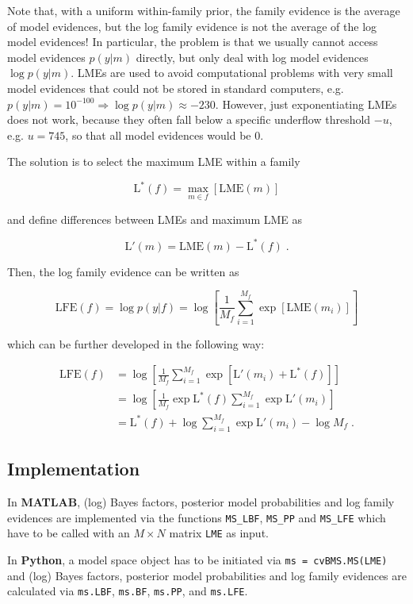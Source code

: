 \vspace{1em}
Note that, with a uniform within-family prior, the family evidence is the average of model evidences, but the log family evidence is not the average of the log model evidences! In particular, the problem is that we usually cannot access model evidences $p(y|m)$ directly, but only deal with log model evidences $\log p(y|m)$. LMEs are used to avoid computational problems with very small model evidences that could not be stored in standard computers, e.g. $p(y|m) = 10^{-100} \Rightarrow \log p(y|m) \approx -230$. However, just exponentiating LMEs does not work, because they often fall below a specific underflow threshold $-u$, e.g. $u = 745$, so that all model evidences would be $0$.

The solution is to select the maximum LME within a family

\begin{equation} \label{eq:LME-max}
\mathrm{L}^{*}(f) = \max_{m \in f} \left[ \mathrm{LME}(m) \right]
\end{equation}

and define differences between LMEs and maximum LME as

\begin{equation} \label{eq:LME-diff}
\mathrm{L}'(m) = \mathrm{LME}(m) - \mathrm{L}^{*}(f) \; .
\end{equation}

Then, the log family evidence can be written as

\begin{equation} \label{eq:LFE-alt}
\mathrm{LFE}(f) = \log p(y|f) = \log \left[ \frac{1}{M_f} \sum_{i=1}^{M_f} \exp \left[ \mathrm{LME}(m_i) \right] \right]
\end{equation}

which can be further developed in the following way:

\begin{equation} \label{eq:LFE-LME}
\begin{split}
\mathrm{LFE}(f) &= \log \left[ \frac{1}{M_f} \sum_{i=1}^{M_f} \exp \left[ \mathrm{L}'(m_i) + \mathrm{L}^{*}(f) \right] \right] \\
&= \log \left[ \frac{1}{M_f} \exp \mathrm{L}^{*}(f) \sum_{i=1}^{M_f} \exp \mathrm{L}'(m_i) \right] \\
&= \mathrm{L}^{*}(f) + \log \sum_{i=1}^{M_f} \exp \mathrm{L}'(m_i) - \log M_f \; .
\end{split}
\end{equation}


\pagebreak
\subsection{Implementation} \label{sec:MS-Imp}

In \textbf{MATLAB}, (log) Bayes factors, posterior model probabilities and log family evidences are implemented via the functions \verb|MS_LBF|, \verb|MS_PP| and \verb|MS_LFE| which have to be called with an $M \times N$ matrix \verb|LME| as input.

In \textbf{Python}, a model space object has to be initiated via \verb|ms = cvBMS.MS(LME)| and (log) Bayes factors, posterior model probabilities and log family evidences are calculated via \verb|ms.LBF|, \verb|ms.BF|, \verb|ms.PP|, and \verb|ms.LFE|.